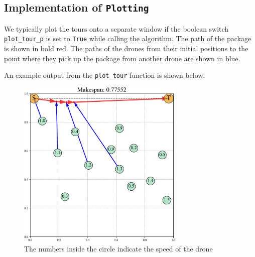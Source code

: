\documentclass[10pt, english, oneside]{report}
\begin{document}
\begin{appendices}
\chapter{Implementation of \textlangle\texttt{Plotting}\textrangle}

We typically plot the tours onto a separate window if the boolean switch \verb|plot_tour_p| 
is set to \verb|True| while calling the algorithm. The path of the package is shown in bold red. 
The paths of the drones from their initial positions to the point where they pick up the package 
from another drone are shown in blue.

An example output from the \verb|plot_tour| function is shown below.

\begin{figure}[H]
\centering
\includegraphics[width=8cm]{docs/pho_example_plot.pdf}
\caption{The numbers inside the circle indicate the speed of the drone}
\end{figure}


\end{appendices}
\end{document}
